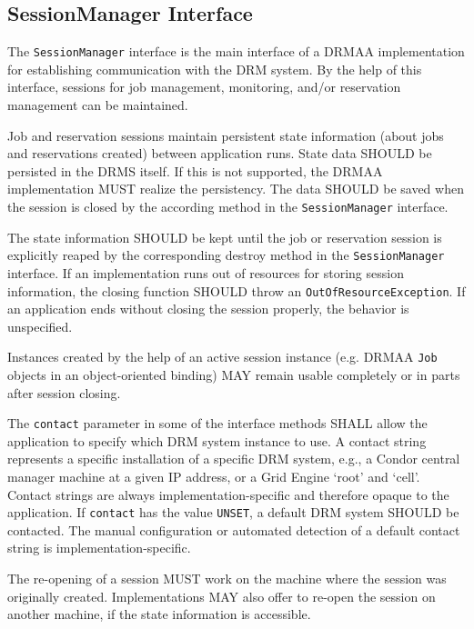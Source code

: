 \documentclass{article}
\newcommand{\h}[1]{\lstinline|#1|}
\begin{document}
\subsection{SessionManager Interface}
\label{sec:sessionmanager}



The \h{SessionManager} interface is the main interface of a DRMAA implementation for establishing communication with the DRM system. By the help of this interface, sessions for job management, monitoring, and/or reservation management can be maintained. 

Job and reservation sessions maintain persistent state information (about jobs and reservations created) between application runs. State data SHOULD be persisted in the DRMS itself. If this is not supported, the DRMAA implementation MUST realize the persistency. The data SHOULD be saved when the session is closed by the according method in the \h{SessionManager} interface. 

The state information SHOULD be kept until the job or reservation session is explicitly reaped by the corresponding destroy method in the \h{SessionManager} interface. If an implementation runs out of resources for storing session information, the closing function SHOULD throw an \h{OutOfResourceException}. If an application ends without closing the session properly, the behavior is unspecified. 

Instances created by the help of an active session instance (e.g. DRMAA \h{Job} objects in an object-oriented binding) MAY remain usable completely or in parts after session closing.

The \h{contact} parameter in some of the interface methods SHALL allow the application to specify which DRM system instance to use. A contact string represents a specific installation of a specific DRM system, e.g., a Condor central manager machine at a given IP address, or a Grid Engine ‘root’ and ‘cell’. Contact strings are always implementation-specific and therefore opaque to the application. If \h{contact} has the value \h{UNSET}, a default DRM system SHOULD be contacted. The manual configuration or automated detection of a default contact string is implementation-specific.

The re-opening of a session MUST work on the machine where the session was originally created. Implementations MAY also offer to re-open the session on another machine, if the state information is accessible. 
\end{document}
